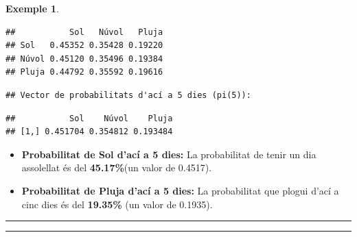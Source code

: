 \documentclass[
  catalan,
]{article}
\providecommand{\tightlist}{%
  \setlength{\itemsep}{0pt}\setlength{\parskip}{0pt}}
\theoremstyle{definition}
\theoremstyle{definition}
\newtheorem{example}{Exemple}[section]
\theoremstyle{definition}
\theoremstyle{definition}
\theoremstyle{remark}
\begin{document}
\begin{example}
\begin{verbatim}
##           Sol   Núvol   Pluja
## Sol   0.45352 0.35428 0.19220
## Núvol 0.45120 0.35496 0.19384
## Pluja 0.44792 0.35592 0.19616
\end{verbatim}

\begin{verbatim}
## Vector de probabilitats d'ací a 5 dies (pi(5)):
\end{verbatim}

\begin{verbatim}
##           Sol    Núvol    Pluja
## [1,] 0.451704 0.354812 0.193484
\end{verbatim}

\begin{itemize}
\tightlist
\item
  \textbf{Probabilitat de Sol d'ací a 5 dies:} La probabilitat de tenir un dia assolellat és del \textbf{45.17\%}(un valor de 0.4517).
\item
  \textbf{Probabilitat de Pluja d'ací a 5 dies:} La probabilitat que plogui d'ací a cinc dies és del \textbf{19.35\%} (un valor de 0.1935).
\end{itemize}

\end{example}

\begin{center}\rule{0.5\linewidth}{0.5pt}\end{center}

\begin{center}\rule{0.5\linewidth}{0.5pt}\end{center}
\end{document}
